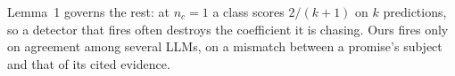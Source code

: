  Lemma~1 governs the rest: at $n_c{=}1$ a class scores $2/(k{+}1)$ on $k$
predictions, so a detector that fires often destroys the coefficient it is chasing. Ours fires
only on agreement among several LLMs, on a mismatch between a promise's subject and that of its
cited evidence.
